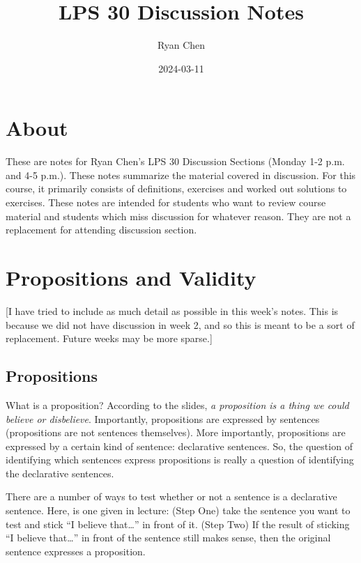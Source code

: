 \documentclass[
]{book}
\title{LPS 30 Discussion Notes}
\author{Ryan Chen}
\date{2024-03-11}
\begin{document}
\maketitle

{
\setcounter{tocdepth}{1}
\tableofcontents
}
\hypertarget{about}{%
\chapter{About}\label{about}}

These are notes for Ryan Chen's LPS 30 Discussion Sections (Monday 1-2 p.m. and 4-5 p.m.). These notes summarize the material covered in discussion. For this course, it primarily consists of definitions, exercises and worked out solutions to exercises. These notes are intended for students who want to review course material and students which miss discussion for whatever reason. They are not a replacement for attending discussion section.

\hypertarget{propositions-and-validity}{%
\chapter{Propositions and Validity}\label{propositions-and-validity}}

{[}I have tried to include as much detail as possible in this week's notes. This is because we did not have discussion in week 2, and so this is meant to be a sort of replacement. Future weeks may be more sparse.{]}

\hypertarget{propositions}{%
\section{Propositions}\label{propositions}}

What is a proposition? According to the slides, \emph{a proposition is a thing we could believe or disbelieve}. Importantly, propositions are expressed by sentences (propositions are not sentences themselves). More importantly, propositions are expressed by a certain kind of sentence: declarative sentences. So, the question of identifying which sentences express propositions is really a question of identifying the declarative sentences.

There are a number of ways to test whether or not a sentence is a declarative sentence. Here, is one given in lecture: (Step One) take the sentence you want to test and stick ``I believe that\ldots{}'' in front of it. (Step Two) If the result of sticking ``I believe that\ldots{}'' in front of the sentence still makes sense, then the original sentence expresses a proposition.
\end{document}

